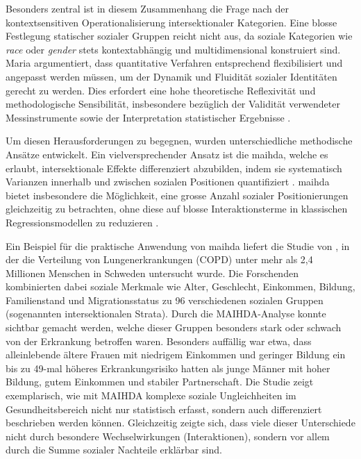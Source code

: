 Besonders zentral ist in diesem Zusammenhang die Frage nach der kontextsensitiven Operationalisierung intersektionaler Kategorien. Eine blosse Festlegung statischer sozialer Gruppen reicht nicht aus, da soziale Kategorien wie \textit{race} oder \textit{gender} stets kontextabhängig und multidimensional konstruiert sind. Maria \textcite{rodo-de-zarateDevelopingGeographiesIntersectionality2014} argumentiert, dass quantitative Verfahren entsprechend flexibilisiert und angepasst werden müssen, um der Dynamik und Fluidität sozialer Identitäten gerecht zu werden. Dies erfordert eine hohe theoretische Reflexivität und methodologische Sensibilität, insbesondere bezüglich der Validität verwendeter Messinstrumente sowie der Interpretation statistischer Ergebnisse \parencite{bauerIntersectionalityQuantitativeResearch2021, websterCenteringSocialtechnicalRelations2021}.

Um diesen Herausforderungen zu begegnen, wurden unterschiedliche methodische Ansätze entwickelt. Ein vielversprechender Ansatz ist die \acrfull{maihda}, welche es erlaubt, intersektionale Effekte differenziert abzubilden, indem sie systematisch Varianzen innerhalb und zwischen sozialen Positionen quantifiziert \parencite{evansTutorialConductingIntersectional2024, grossModellingIntersectionalityQuantitative2023, axelssonfiskChronicObstructivePulmonary2018}. \gls{maihda} bietet insbesondere die Möglichkeit, eine grosse Anzahl sozialer Positionierungen gleichzeitig zu betrachten, ohne diese auf blosse Interaktionsterme in klassischen Regressionsmodellen zu reduzieren \parencite{bauerIntersectionalityQuantitativeResearch2021}.

Ein Beispiel für die praktische Anwendung von \gls{maihda} liefert die Studie von \textcite{axelssonfiskChronicObstructivePulmonary2018}, in der die Verteilung von Lungenerkrankungen (COPD) unter mehr als 2{,}4 Millionen Menschen in Schweden untersucht wurde. Die Forschenden kombinierten dabei soziale Merkmale wie Alter, Geschlecht, Einkommen, Bildung, Familienstand und Migrationsstatus zu 96 verschiedenen sozialen Gruppen (sogenannten intersektionalen Strata). Durch die MAIHDA-Analyse konnte sichtbar gemacht werden, welche dieser Gruppen besonders stark oder schwach von der Erkrankung betroffen waren. Besonders auffällig war etwa, dass alleinlebende ältere Frauen mit niedrigem Einkommen und geringer Bildung ein bis zu 49-mal höheres Erkrankungsrisiko hatten als junge Männer mit hoher Bildung, gutem Einkommen und stabiler Partnerschaft. Die Studie zeigt exemplarisch, wie mit MAIHDA komplexe soziale Ungleichheiten im Gesundheitsbereich nicht nur statistisch erfasst, sondern auch differenziert beschrieben werden können. Gleichzeitig zeigte sich, dass viele dieser Unterschiede nicht durch besondere Wechselwirkungen (Interaktionen), sondern vor allem durch die Summe sozialer Nachteile erklärbar sind. 

